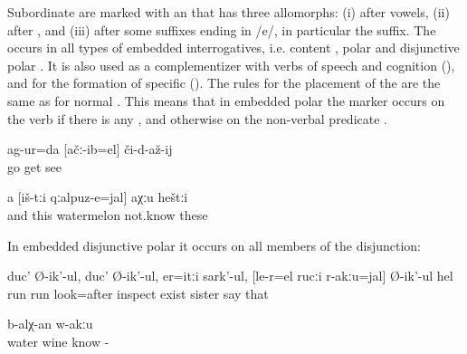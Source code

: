 Subordinate  are marked with an  that has three allomorphs: (i)  after vowels, (ii)  after , and (iii)  after some suffixes ending in /e/, in particular the  suffix. The  occurs in all types of embedded interrogatives, i.e. content , polar and disjunctive polar . It is also used as a complementizer with verbs of speech and cognition (), and for the formation of specific  (). The rules for the placement of the  are the same as for normal . This means that in embedded polar  the marker occurs on the verb if there is any , and otherwise on the non-verbal predicate .
%
\begin{exe}

	\ex	\label{ex:We went to see if (the cartridge) had struck}
	\gll	ag-ur=da	[ačː-ib=el]	či-d-až-ij\\
		go	get	see\\
	\glt	{}

	\ex	\label{ex:I don't know whether these are watermelons}
	\gll	a	[iš-tːi	qːalpuz-e=jal]	aχːu	heštːi\\
		and	this	watermelon	not.know	these\\
	\glt	{}

\end{exe}

In embedded disjunctive polar  it occurs on all members of the disjunction:
%
\begin{exe}
	\ex	\label{ex:He ran and ran, looked around, wondering whether his sister is there or not}
	\gll	duc'	Ø-ik'-ul,	duc'	Ø-ik'-ul,	er=itːi	sark'-ul,		[le-r=el	rucːi	r-akːu=jal]	Ø-ik'-ul	hel\\
		run		run		look=after	inspect	exist	sister		say	that\\
	\glt	{}

	\ex	\label{ex:Is this water or wine, I do not know}
	\gll	[hin	ca-d=el	iχ-tːi	čaˁʁir=el]	b-alχ-an	w-akːu\\
		water			wine	know	-\\
	\glt	{}
\end{exe}

